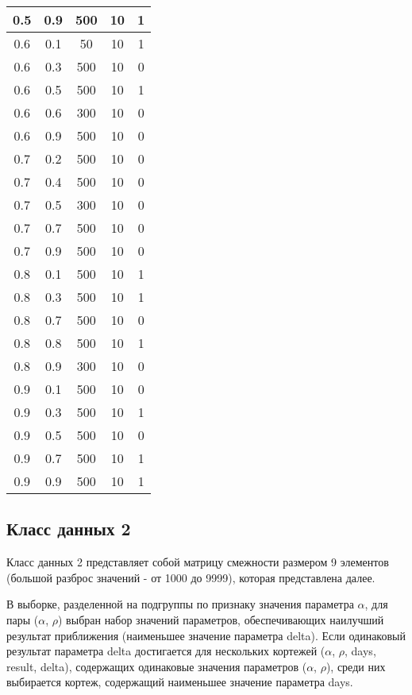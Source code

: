 \begin{center}
\begin{longtable}[c]{|c|c|c|c|c|}
		0.5 & 0.9 & 500 & 10 & 1 \\ \hline
		0.6 & 0.1 & 50 & 10 & 1 \\
		0.6 & 0.3 & 500 & 10 & 0 \\
		0.6 & 0.5 & 500 & 10 & 1 \\
		0.6 & 0.6 & 300 & 10 & 0 \\
		0.6 & 0.9 & 500 & 10 & 0 \\ \hline
		0.7 & 0.2 & 500 & 10 & 0 \\
		0.7 & 0.4 & 500 & 10 & 0 \\
		0.7 & 0.5 & 300 & 10 & 0 \\
		0.7 & 0.7 & 500 & 10 & 0 \\
		0.7 & 0.9 & 500 & 10 & 0 \\ \hline
		0.8 & 0.1 & 500 & 10 & 1 \\
		0.8 & 0.3 & 500 & 10 & 1 \\
		0.8 & 0.7 & 500 & 10 & 0 \\
		0.8 & 0.8 & 500 & 10 & 1 \\
		0.8 & 0.9 & 300 & 10 & 0 \\ \hline
		0.9 & 0.1 & 500 & 10 & 0 \\
		0.9 & 0.3 & 500 & 10 & 1 \\
		0.9 & 0.5 & 500 & 10 & 0\\
		0.9 & 0.7 & 500 & 10 & 1 \\
		0.9 & 0.9 & 500 & 10 & 1 \\ \hline
	\end{longtable}
\end{center}

\subsection{Класс данных 2}
\label{class2}


Класс данных 2 представляет собой матрицу смежности размером 9 элементов (большой разброс значений - от 1000 до 9999), которая представлена далее.

В выборке, разделенной на подгруппы по признаку значения параметра $\alpha$, для пары ($\alpha$, $\rho$) выбран набор значений параметров, обеспечивающих наилучший результат приближения (наименьшее значение параметра delta). Если одинаковый результат параметра delta достигается для нескольких кортежей ($\alpha$, $\rho$, days, result, delta), содержащих одинаковые значения параметров ($\alpha$, $\rho$), среди них выбирается кортеж, содержащий наименьшее значение параметра days. 


